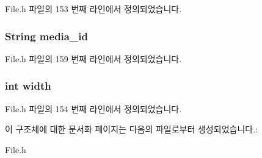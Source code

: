 File.\-h 파일의 153 번째 라인에서 정의되었습니다.

\hypertarget{struct__ImageExtends_af61699ef5054dcf075cbf29d59ed8d3c}{
\subsubsection[{media\-\_\-id}]{\setlength{\rightskip}{0pt plus 5cm}String media\-\_\-id}}\label{struct__ImageExtends_af61699ef5054dcf075cbf29d59ed8d3c}


File.\-h 파일의 159 번째 라인에서 정의되었습니다.

\hypertarget{struct__ImageExtends_a2474a5474cbff19523a51eb1de01cda4}{
\subsubsection[{width}]{\setlength{\rightskip}{0pt plus 5cm}int width}}\label{struct__ImageExtends_a2474a5474cbff19523a51eb1de01cda4}


File.\-h 파일의 154 번째 라인에서 정의되었습니다.



이 구조체에 대한 문서화 페이지는 다음의 파일로부터 생성되었습니다.\-:\begin{DoxyCompactItemize}
\item 
File.\-h\end{DoxyCompactItemize}
